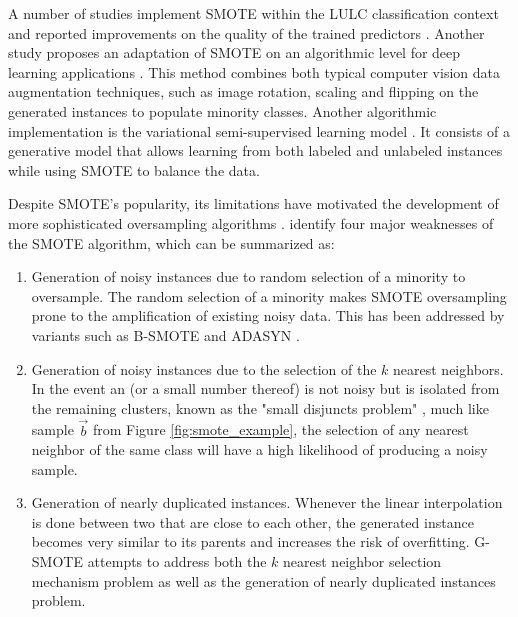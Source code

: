 \documentclass[remotesensing,article,submit,moreauthors,pdftex]{Definitions/mdpi}
\begin{document}
\begin{paracol}{2}
\linenumbers
\switchcolumn

A number of studies implement SMOTE within the LULC classification context and
reported improvements on the quality of the trained predictors
\cite{Jozdani2019, Bogner2018}. Another study proposes an adaptation of SMOTE
on an algorithmic level for deep learning applications \cite{Zhu2020}. This
method combines both typical computer vision data augmentation techniques,
such as image rotation, scaling and flipping on the generated instances to
populate minority classes. Another algorithmic implementation is the
variational semi-supervised learning model \cite{Cenggoro2018}. It consists of
a generative model that allows learning from both labeled and unlabeled
instances while using SMOTE to balance the data.

Despite SMOTE's popularity, its limitations have motivated the development of
more sophisticated oversampling algorithms \cite{Douzas2019, Han2005, Ma2017,
Douzas2017, Douzas2018, HaiboHe2008}. \cite{Douzas2019} identify four major
weaknesses of the SMOTE algorithm, which can be summarized as:

\begin{enumerate}
    \item Generation of noisy instances due to random selection of a
        minority to oversample. The random
        selection of a minority makes SMOTE
        oversampling prone to the amplification of existing noisy data. This
        has been addressed by variants such as B-SMOTE \cite{Han2005} and
        ADASYN \cite{HaiboHe2008}. 

    \item Generation of noisy instances due to the selection of the $k$
        nearest neighbors. In the event an
        (or a small number thereof) is not noisy but is isolated from the
        remaining clusters, known as the "small disjuncts problem"
        \cite{holte1989}, much like sample $\overrightarrow{b}$ from Figure
        \ref{fig:smote_example}, the selection of any nearest neighbor of the
        same class will have a high likelihood of producing a noisy sample.

    \item Generation of nearly duplicated instances. Whenever the linear
        interpolation is done between two
        that are close to each other, the generated instance becomes very
        similar to its parents and increases the risk of overfitting. G-SMOTE
        \cite{Douzas2019} attempts to address both the $k$ nearest neighbor
        selection mechanism problem as well as the generation of nearly
        duplicated instances problem. 


\end{enumerate}
\end{paracol}
\end{document}
